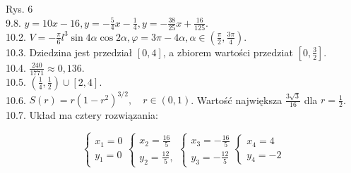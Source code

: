 \documentclass[10pt]{article}
\begin{document}
Rys. 6\\
9.8. $y=10 x-16, y=-\frac{5}{4} x-\frac{1}{4}, y=-\frac{38}{25} x+\frac{16}{125}$.\\
10.2. $V=-\frac{\pi}{6} l^{3} \sin 4 \alpha \cos 2 \alpha, \varphi=3 \pi-4 \alpha, \alpha \in\left(\frac{\pi}{2}, \frac{3 \pi}{4}\right)$.\\
10.3. Dziedzina jest przedział $[0,4]$, a zbiorem wartości przedziat $\left[0, \frac{3}{2}\right]$.\\
10.4. $\frac{240}{1771} \approx 0,136$.\\
10.5. $\left(\frac{1}{4}, \frac{1}{2}\right) \cup[2,4]$.\\
10.6. $S(r)=r\left(1-r^{2}\right)^{3 / 2}, \quad r \in(0,1)$. Wartość największa $\frac{3 \sqrt{3}}{16}$ dla $r=\frac{1}{2}$.\\
10.7. Układ ma cztery rozwiązania:

$$
\left\{\begin{array} { l } 
{ x _ { 1 } = 0 } \\
{ y _ { 1 } = 0 }
\end{array} \left\{\begin{array} { l } 
{ x _ { 2 } = \frac { 1 6 } { 5 } } \\
{ y _ { 2 } = \frac { 1 2 } { 5 } , }
\end{array} \left\{\begin{array} { l } 
{ x _ { 3 } = - \frac { 1 6 } { 5 } } \\
{ y _ { 3 } = - \frac { 1 2 } { 5 } }
\end{array} \left\{\begin{array}{l}
x_{4}=4 \\
y_{4}=-2
\end{array}\right.\right.\right.\right.
$$
\end{document}
